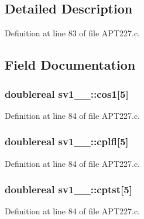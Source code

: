 \subsection{Detailed Description}


Definition at line 83 of file A\+P\+T227.\+c.



\subsection{Field Documentation}
\subsubsection[{\texorpdfstring{cos1}{cos1}}]{\setlength{\rightskip}{0pt plus 5cm}doublereal sv1\+\_\+\_\+\+::cos1\mbox{[}5\mbox{]}}\hypertarget{structsv1__1___a8d98983c78a5422a4164dfb90a9fc6e2}{}\label{structsv1__1___a8d98983c78a5422a4164dfb90a9fc6e2}


Definition at line 84 of file A\+P\+T227.\+c.

\subsubsection[{\texorpdfstring{cplfl}{cplfl}}]{\setlength{\rightskip}{0pt plus 5cm}doublereal sv1\+\_\+\_\+\+::cplfl\mbox{[}5\mbox{]}}\hypertarget{structsv1__1___ab57e491c3efa057480f59242243ca49f}{}\label{structsv1__1___ab57e491c3efa057480f59242243ca49f}


Definition at line 84 of file A\+P\+T227.\+c.

\subsubsection[{\texorpdfstring{cptst}{cptst}}]{\setlength{\rightskip}{0pt plus 5cm}doublereal sv1\+\_\+\_\+\+::cptst\mbox{[}5\mbox{]}}\hypertarget{structsv1__1___a3a31d772830bb00996f180502c536904}{}\label{structsv1__1___a3a31d772830bb00996f180502c536904}


Definition at line 84 of file A\+P\+T227.\+c.

